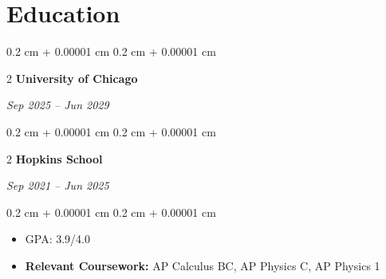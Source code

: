 \documentclass[10pt, letterpaper]{article}
\newenvironment{highlights}{
    \begin{itemize}[
        topsep=0.10 cm,
        parsep=0.10 cm,
        partopsep=0pt,
        itemsep=0pt,
        leftmargin=0.4 cm + 10pt
    ]
}{
    \end{itemize}
} %
\newenvironment{onecolentry}{
    \begin{adjustwidth}{
        0.2 cm + 0.00001 cm
    }{
        0.2 cm + 0.00001 cm
    }
}{
    \end{adjustwidth}
} %
\newenvironment{twocolentry}[2][]{
    \onecolentry
    \def\secondColumn{#2}
    \setcolumnwidth{\fill, 4.5 cm}
    \begin{paracol}{2}
}{
    \switchcolumn \raggedleft \secondColumn
    \end{paracol}
    \endonecolentry
} %
\let\hrefWithoutArrow\href
\renewcommand{\href}[2]{\hrefWithoutArrow{#1}{\ifthenelse{\equal{#2}{}}{ }{#2 }\raisebox{.15ex}{\footnotesize \faExternalLink*}}}
\begin{document}



    

    \section{Education}
    
    \begin{twocolentry}{\textit{Sep 2025 – Jun 2029 }}{\textbf{University of Chicago}}
    \end{twocolentry}
    
    \vspace{0.1cm}
    
    \begin{twocolentry}{\textit{Sep 2021 – Jun 2025}}{\textbf{Hopkins School}}
    \end{twocolentry}
    
    \vspace{0.1cm}
    \begin{onecolentry}
        \begin{highlights}
            \item GPA: 3.9/4.0 
            \item \textbf{Relevant Coursework:} AP Calculus BC, AP Physics C, AP Physics 1  
        \end{highlights}
    \end{onecolentry}
    
\end{document}
